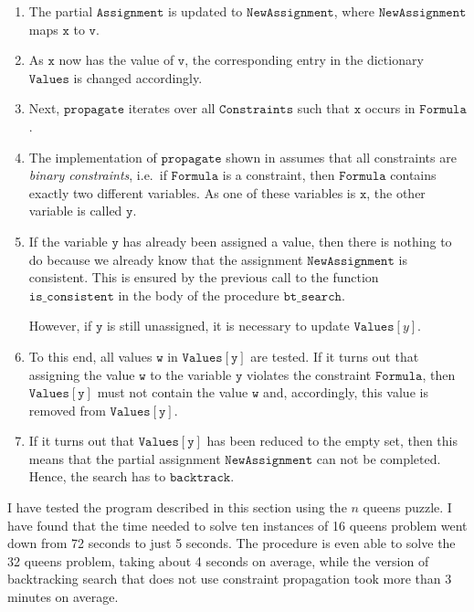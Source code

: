 \begin{enumerate}
\item The partial $\mathtt{Assignment}$ is updated to $\mathtt{NewAssignment}$, where $\mathtt{NewAssignment}$
      maps $\mathtt{x}$ to $\mathtt{v}$.
\item As $\mathtt{x}$ now has the value of $\mathtt{v}$, the corresponding entry in the dictionary
      $\mathtt{Values}$ is changed accordingly. 
\item Next, $\mathtt{propagate}$ iterates over all $\mathtt{Constraints}$ such that $\mathtt{x}$ occurs in 
      $\mathtt{Formula}$.
\item The implementation of $\mathtt{propagate}$ shown in  assumes
      that all constraints are \emph{\color{blue}binary constraints}, i.e.~if $\mathtt{Formula}$ is a
      constraint, then $\mathtt{Formula}$ contains exactly two different variables.
      As one of these variables is $\mathtt{x}$, the other variable is called $\mathtt{y}$.
\item If the variable $\mathtt{y}$ has already been assigned a value, then there is nothing to do because
      we already know that the assignment $\mathtt{NewAssignment}$ is consistent.  This is ensured by the
      previous call to the function $\mathtt{is\_consistent}$ in the body of the procedure $\mathtt{bt\_search}$.

      However, if $\mathtt{y}$ is still unassigned, it is necessary to update $\mathtt{Values}[y]$.
\item To this end, all values $\mathtt{w}$ in $\mathtt{Values[y]}$ are tested.  
      If it turns out that assigning the value $\mathtt{w}$ to the variable $\mathtt{y}$ violates the
      constraint $\mathtt{Formula}$, then $\mathtt{Values[y]}$ must not contain the value $\mathtt{w}$ 
      and, accordingly, this value is removed from $\mathtt{Values[y]}$.
\item If it turns out that $\mathtt{Values[y]}$ has been reduced to the empty set, then this means that the
      partial assignment $\mathtt{NewAssignment}$ can not be completed.  Hence, the search has to
      $\mathtt{backtrack}$.
\end{enumerate}
I have tested the program described in this section using the $n$ queens puzzle. 
I have found that the time needed to solve ten
instances of 16 queens problem went down from 72 seconds to just 5 seconds.  The procedure is even able to
solve the 32 queens problem, taking about 4 seconds on average, while the version of backtracking search that
does not use constraint propagation took more than 3 minutes on average.


